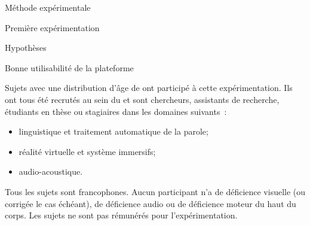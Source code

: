 \documentclass[myfrancais,ngerman,english,french]{mythesis}
\begin{document}
\begin{mychapter}{Méthode expérimentale}
\begin{mysection}{Première expérimentation}
\begin{mysubsection}{Hypothèses}
\begin{myparagraph}{ Bonne utilisabilité de la plateforme}
				\end{myparagraph}
			\end{mysubsection}
			\begin{mysubsection}{Sujets}
				 avec une distribution d'âge de  ont participé à cette expérimentation.
				Ils ont tous été recrutés au sein du  et sont chercheurs, assistants de recherche, étudiants en thèse ou stagiaires dans les domaines suivants~:
				\begin{itemize}
					\item linguistique et traitement automatique de la parole;
					\item réalité virtuelle et système immersifs;
					\item audio-acoustique.
				\end{itemize}

				Tous les sujets sont francophones.
				Aucun participant n'a de déficience visuelle (ou corrigée le cas échéant), de déficience audio ou de déficience moteur du haut du corps.
				Les sujets ne sont pas rémunérés pour l'expérimentation.


\end{mysubsection}
\end{mysection}
\end{mychapter}
\end{document}
